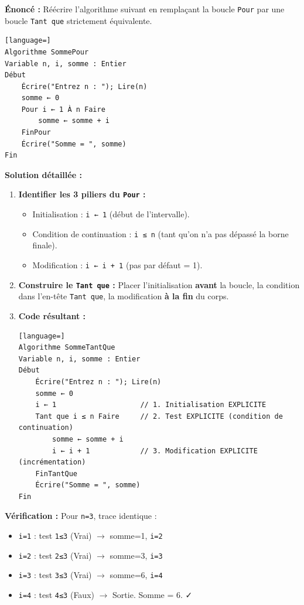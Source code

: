 \documentclass[11pt]{article}
\begin{document}
\begin{exoresolu}
\textbf{Énoncé :} Réécrire l'algorithme suivant en remplaçant la boucle \texttt{Pour} par une boucle \texttt{Tant que} strictement équivalente.
\begin{lstlisting}[language=]
Algorithme SommePour
Variable n, i, somme : Entier
Début
    Écrire("Entrez n : "); Lire(n)
    somme ← 0
    Pour i ← 1 À n Faire
        somme ← somme + i
    FinPour
    Écrire("Somme = ", somme)
Fin
\end{lstlisting}
\tcblower
\textbf{Solution détaillée :}
\begin{enumerate}
    \item \textbf{Identifier les 3 piliers du \texttt{Pour} :}
    \begin{itemize}
        \item Initialisation : \texttt{i ← 1} (début de l'intervalle).
        \item Condition de continuation : \texttt{i ≤ n} (tant qu'on n'a pas dépassé la borne finale).
        \item Modification : \texttt{i ← i + 1} (pas par défaut = 1).
    \end{itemize}
    \item \textbf{Construire le \texttt{Tant que} :} Placer l'initialisation \textbf{avant} la boucle, la condition dans l'en-tête \texttt{Tant que}, la modification \textbf{à la fin} du corps.
    \item \textbf{Code résultant :}
\begin{lstlisting}[language=]
Algorithme SommeTantQue
Variable n, i, somme : Entier
Début
    Écrire("Entrez n : "); Lire(n)
    somme ← 0
    i ← 1                    // 1. Initialisation EXPLICITE
    Tant que i ≤ n Faire     // 2. Test EXPLICITE (condition de continuation)
        somme ← somme + i
        i ← i + 1            // 3. Modification EXPLICITE (incrémentation)
    FinTantQue
    Écrire("Somme = ", somme)
Fin
\end{lstlisting}
\end{enumerate}
\textbf{Vérification :} Pour \texttt{n=3}, trace identique :
\begin{itemize}
    \item \texttt{i=1} : test \texttt{1≤3} (Vrai) $\rightarrow$ somme=1, \texttt{i=2}
    \item \texttt{i=2} : test \texttt{2≤3} (Vrai) $\rightarrow$ somme=3, \texttt{i=3}
    \item \texttt{i=3} : test \texttt{3≤3} (Vrai) $\rightarrow$ somme=6, \texttt{i=4}
    \item \texttt{i=4} : test \texttt{4≤3} (Faux) $\rightarrow$ Sortie. Somme = 6. ✓
\end{itemize}
\end{exoresolu}
\end{document}
